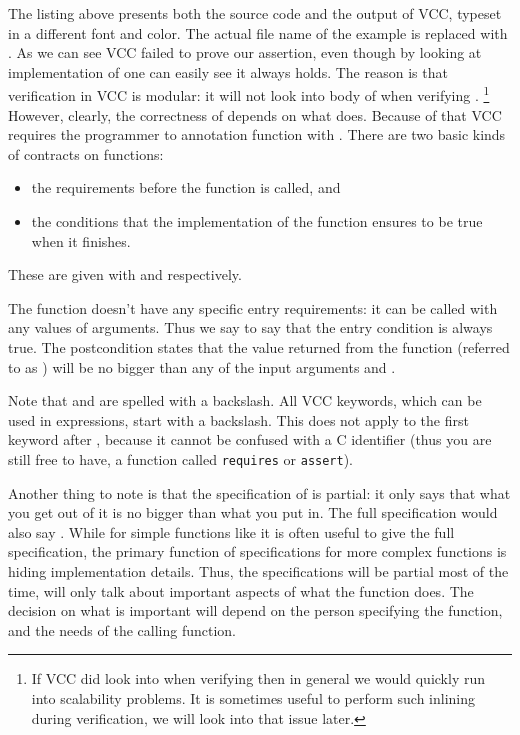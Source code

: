 
\noindent
The listing above presents both the source code and the output
of VCC, typeset in a different font and color.
The actual file name of the example is replaced with .
As we can see VCC failed to prove our assertion,
even though by looking at implementation of 
one can easily see it always holds.
The reason is that verification in VCC is modular:
it will not look into body of  when
verifying .%
\footnote{
  If VCC did look into  when verifying 
  then in general we would quickly run into scalability problems.
  It is sometimes useful to perform such inlining during verification,
  we will look into that issue later.
}
However, clearly, the correctness of  depends on what 
does.
Because of that VCC requires the programmer to annotation function
with .
There are two basic kinds of contracts on functions:
\begin{itemize}
\item the requirements before the function is called, and
\item the conditions that the implementation of the function ensures to be true when it finishes.
\end{itemize}
These are given with  and  respectively.


\noindent
The function  doesn't have any specific entry requirements:
it can be called with any values of arguments.
Thus we say  to say that the entry condition is
always true.
The postcondition states that the value returned from the function (referred to as \vcc{\result})
will be no bigger than any of the input arguments  and .

Note that \vcc{\true} and \vcc{\result} are spelled with a backslash.
All VCC keywords, which can be used in expressions, start with a backslash.
This does not apply to the first keyword after \vcc{_}, because it cannot
be confused with a C identifier (thus you are still free to have, \eg
a function called \texttt{requires} or \texttt{assert}).

Another thing to note is that the specification of  is partial:
it only says that what you get out of it is no bigger than what you put in.
The full specification would also say .
While for simple functions like  it is often useful to give the full
specification, the primary function of specifications for more complex
functions is hiding implementation details.
Thus, the specifications will be partial most of the time, will only
talk about important aspects of what the function does.
The decision on what is important will depend on the person specifying
the function, and the needs of the calling function.

